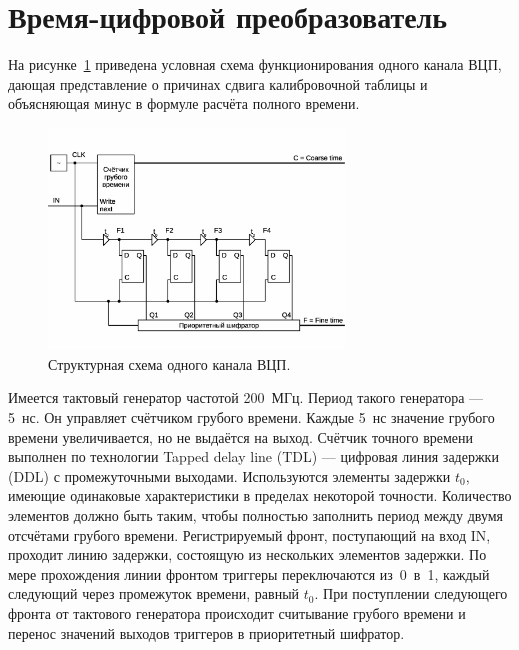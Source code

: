 \section{Время-цифровой преобразователь}\label{sec:secTDC}

На рисунке~\ref{fig:TDCscheme} приведена условная схема функционирования одного канала ВЦП, дающая представление о причинах сдвига калибровочной таблицы и объясняющая минус в формуле расчёта полного времени.

\begin{figure}[H]
\centering
\includegraphics[width=0.7\textwidth]{pictures/TDC.eps}
\caption{Структурная схема одного канала ВЦП.}
\label{fig:TDCscheme}
\end{figure}

Имеется тактовый генератор частотой 200~МГц. Период такого генератора --- 5~нс. Он управляет счётчиком грубого времени. Каждые 5~нс значение грубого времени увеличивается, но не выдаётся на выход. Счётчик точного времени выполнен по технологии Tapped delay line (TDL) --- цифровая линия задержки (DDL) с промежуточными выходами. Используются элементы задержки $ t_{0} $, имеющие одинаковые характеристики в пределах некоторой точности. Количество элементов должно быть таким, чтобы полностью заполнить период между двумя отсчётами грубого времени. Регистрируемый фронт, поступающий на вход IN, проходит линию задержки, состоящую из нескольких элементов задержки. По мере прохождения линии фронтом триггеры переключаются из~0~в~1, каждый следующий через промежуток времени, равный $ t_{0} $. При поступлении следующего фронта от тактового генератора происходит считывание грубого времени и перенос значений выходов триггеров в приоритетный шифратор.

